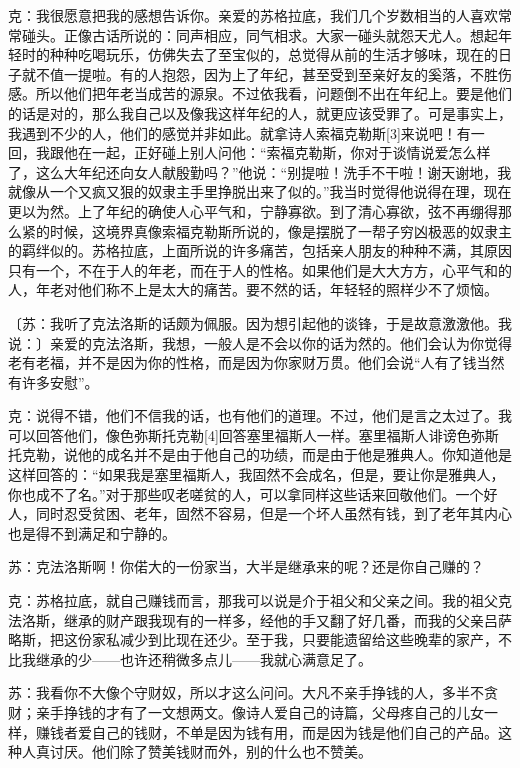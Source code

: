 \documentclass[12pt,oneside]{book}
\begin{document}
克：我很愿意把我的感想告诉你。亲爱的苏格拉底，我们几个岁数相当的人喜欢常常碰头。正像古话所说的：同声相应，同气相求。大家一碰头就怨天尤人。想起年轻时的种种吃喝玩乐，仿佛失去了至宝似的，总觉得从前的生活才够味，现在的日子就不值一提啦。有的人抱怨，因为上了年纪，甚至受到至亲好友的奚落，不胜伤感。所以他们把年老当成苦的源泉。不过依我看，问题倒不出在年纪上。要是他们的话是对的，那么我自己以及像我这样年纪的人，就更应该受罪了。可是事实上，我遇到不少的人，他们的感觉并非如此。就拿诗人索福克勒斯[3]来说吧！有一回，我跟他在一起，正好碰上别人问他：“索福克勒斯，你对于谈情说爱怎么样了，这么大年纪还向女人献殷勤吗？”他说：“别提啦！洗手不干啦！谢天谢地，我就像从一个又疯又狠的奴隶主手里挣脱出来了似的。”我当时觉得他说得在理，现在更以为然。上了年纪的确使人心平气和，宁静寡欲。到了清心寡欲，弦不再绷得那么紧的时候，这境界真像索福克勒斯所说的，像是摆脱了一帮子穷凶极恶的奴隶主的羁绊似的。苏格拉底，上面所说的许多痛苦，包括亲人朋友的种种不满，其原因只有一个，不在于人的年老，而在于人的性格。如果他们是大大方方，心平气和的人，年老对他们称不上是太大的痛苦。要不然的话，年轻轻的照样少不了烦恼。

〔苏：我听了克法洛斯的话颇为佩服。因为想引起他的谈锋，于是故意激激他。我说：〕亲爱的克法洛斯，我想，一般人是不会以你的话为然的。他们会认为你觉得老有老福，并不是因为你的性格，而是因为你家财万贯。他们会说“人有了钱当然有许多安慰”。

克：说得不错，他们不信我的话，也有他们的道理。不过，他们是言之太过了。我可以回答他们，像色弥斯托克勒[4]回答塞里福斯人一样。塞里福斯人诽谤色弥斯托克勒，说他的成名并不是由于他自己的功绩，而是由于他是雅典人。你知道他是这样回答的：“如果我是塞里福斯人，我固然不会成名，但是，要让你是雅典人，你也成不了名。”对于那些叹老嗟贫的人，可以拿同样这些话来回敬他们。一个好人，同时忍受贫困、老年，固然不容易，但是一个坏人虽然有钱，到了老年其内心也是得不到满足和宁静的。

苏：克法洛斯啊！你偌大的一份家当，大半是继承来的呢？还是你自己赚的？

克：苏格拉底，就自己赚钱而言，那我可以说是介于祖父和父亲之间。我的祖父克法洛斯，继承的财产跟我现有的一样多，经他的手又翻了好几番，而我的父亲吕萨略斯，把这份家私减少到比现在还少。至于我，只要能遗留给这些晚辈的家产，不比我继承的少——也许还稍微多点儿——我就心满意足了。

苏：我看你不大像个守财奴，所以才这么问问。大凡不亲手挣钱的人，多半不贪财；亲手挣钱的才有了一文想两文。像诗人爱自己的诗篇，父母疼自己的儿女一样，赚钱者爱自己的钱财，不单是因为钱有用，而是因为钱是他们自己的产品。这种人真讨厌。他们除了赞美钱财而外，别的什么也不赞美。
\end{document}
